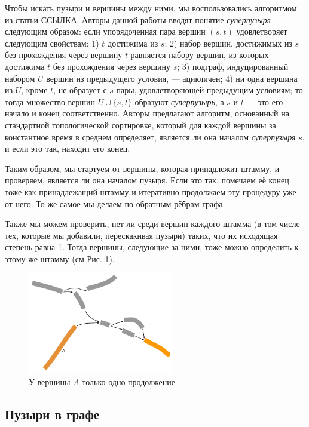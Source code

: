 \documentclass{spbau-diploma}
\begin{document}
Чтобы искать пузыри и вершины между ними, мы воспользовались алгоритмом из статьи ССЫЛКА. Авторы данной работы вводят понятие \textit{суперпузыря} следующим образом: если упорядоченная пара вершин $(s,t)$ удовлетворяет следующим свойствам:
1) $t$ достижима из $s$;
2) набор вершин, достижимых из $s$ без прохождения через вершину $t$ равняется набору вершин, из которых достижима $t$ без прохождения через вершину $s$;
3) подграф, индуцированный набором $U$ вершин из предыдущего условия, --- ацикличен;
4) ни одна вершина из $U$, кроме $t$, не образует с $s$ пары, удовлетворяющей предыдущим условиям; то тогда множество вершин $U \cup \{s,t\}$ образуют \textit{суперпузырь}, а $s$ и $t$ --- это его начало и конец соответственно. Авторы предлагают алгоритм, основанный на стандартной топологической сортировке, который для каждой вершины за константное время в среднем определяет, является ли она началом \textit{суперпузыря} $s$, и если это так, находит его конец.

Таким образом, мы стартуем от вершины, которая принадлежит штамму, и проверяем, является ли она началом пузыря. Если это так, помечаем её конец тоже как принадлежащий штамму и итеративно продолжаем эту процедуру уже от него. То же самое мы делаем по обратным рёбрам графа.


Также мы можем проверить, нет ли среди вершин каждого штамма (в том числе тех, которые мы добавили, перескакивая пузыри) таких, что их исходящая степень равна 1. Тогда вершины, следующие за ними, тоже можно определить к этому же штамму (см Рис. \ref{one_continue}).

\begin{figure}[t]
\centering
\includegraphics[width=0.57\textwidth]{pics/one_continue.png}
\caption{У вершины $A$ только одно продолжение}
\label{one_continue}
\end{figure}


\subsection{Пузыри в графе}
\end{document}
